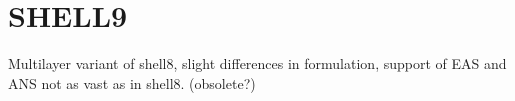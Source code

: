\chapter{SHELL9}
Multilayer variant of shell8, slight differences in formulation, support of EAS
and ANS not as vast as in shell8. (obsolete?)